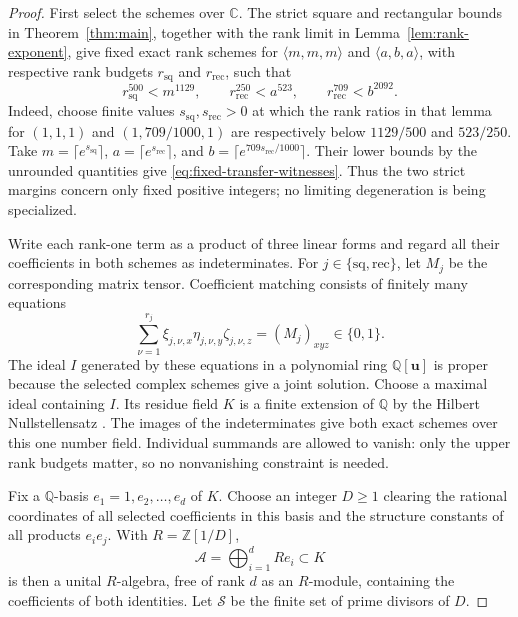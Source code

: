 \documentclass[11pt]{article}
\numberwithin{equation}{section}
\theoremstyle{definition}
\theoremstyle{remark}
\begin{document}
\begin{proof}
First select the schemes over \(\mathbb C\).  The strict square and rectangular
bounds in Theorem~\ref{thm:main}, together with the rank limit in
Lemma~\ref{lem:rank-exponent}, give fixed exact rank schemes for
\(\langle m,m,m\rangle\) and \(\langle a,b,a\rangle\), with respective
rank budgets \(r_{\mathrm{sq}}\) and \(r_{\mathrm{rec}}\), such that
\begin{equation}\label{eq:fixed-transfer-witnesses}
 r_{\mathrm{sq}}^{500}<m^{1129},\qquad
 r_{\mathrm{rec}}^{250}<a^{523},\qquad
 r_{\mathrm{rec}}^{709}<b^{2092}.
\end{equation}
Indeed, choose finite values \(s_{\mathrm{sq}},s_{\mathrm{rec}}>0\)
at which the rank ratios in that lemma for \((1,1,1)\) and
\((1,709/1000,1)\) are respectively below \(1129/500\) and \(523/250\).
Take \(m=\lceil e^{s_{\mathrm{sq}}}\rceil\),
\(a=\lceil e^{s_{\mathrm{rec}}}\rceil\), and
\(b=\lceil e^{709s_{\mathrm{rec}}/1000}\rceil\).  Their lower bounds
by the unrounded quantities give \eqref{eq:fixed-transfer-witnesses}.
Thus the two strict margins concern only fixed positive integers;
no limiting degeneration is being specialized.

Write each rank-one term as a product of three linear forms and regard
all their coefficients in both schemes as indeterminates.  For
\(j\in\{\mathrm{sq},\mathrm{rec}\}\), let \(M_j\) be the corresponding
matrix tensor.  Coefficient matching consists of
finitely many equations
\[
 \sum_{\nu=1}^{r_j}
 \xi_{j,\nu,x}\eta_{j,\nu,y}\zeta_{j,\nu,z}
 =(M_j)_{xyz}\in\{0,1\}.
\]
The ideal \(I\) generated by these equations in a polynomial ring
\(\mathbb Q[\mathbf u]\) is proper because the selected complex
schemes give a joint solution.  Choose a maximal ideal containing
\(I\).  Its residue field \(K\) is a finite extension of \(\mathbb Q\)
by the Hilbert Nullstellensatz
\cite[Theorem~10.34.1, Tag~00FV]{stacks-nullstellensatz}.
The images of the indeterminates give both exact schemes over this
one number field.  Individual summands are allowed to vanish: only
the upper rank budgets matter, so no nonvanishing constraint is needed.

Fix a \(\mathbb Q\)-basis \(e_1=1,e_2,\ldots,e_d\) of \(K\).
Choose an integer \(D\ge1\) clearing the rational coordinates of all
selected coefficients in this basis and the structure constants of
all products \(e_i e_j\).  With \(R=\mathbb Z[1/D]\),
\[
 \mathcal A=\bigoplus_{i=1}^d R e_i\subset K
\]
is then a unital \(R\)-algebra, free of rank \(d\) as an \(R\)-module,
containing the coefficients of both identities.  Let \(\mathcal S\)
be the finite set of prime divisors of \(D\).


\end{proof}
\end{document}
